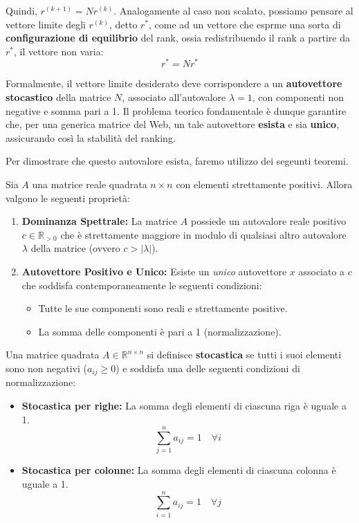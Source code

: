 Quindi, $r^{(k + 1)} = N r^{(k)}$. Analogamente al caso non scalato, possiamo pensare al vettore limite degli $r^{(k)}$, detto $r^*$, come ad un vettore che esprme una sorta di \textbf{configurazione di equilibrio} del rank, ossia redistribuendo il rank a partire da $r^*$, il vettore non varia: 
\[
r^* = N r^*
\]

Formalmente, il vettore limite desiderato deve corrispondere a un \textbf{autovettore stocastico} della matrice $N$, associato all'autovalore $\lambda=1$, con componenti non negative e somma pari a 1.
Il problema teorico fondamentale è dunque garantire che, per una generica matrice del Web, un tale autovettore \textbf{esista} e sia \textbf{unico}, assicurando così la stabilità del ranking.

Per dimostrare che questo autovalore esista, faremo utilizzo dei segeunti teoremi.

\begin{teorema}\label{teo:th_perron}
Sia $A$ una matrice reale quadrata $n \times n$ con elementi strettamente positivi. Allora valgono le seguenti proprietà:
\begin{enumerate}
    \item \textbf{Dominanza Spettrale:} La matrice $A$ possiede un autovalore reale positivo $c \in \mathbb{R}_{>0}$ che è strettamente maggiore in modulo di qualsiasi altro autovalore $\lambda$ della matrice (ovvero $c > |\lambda|$).
    \item \textbf{Autovettore Positivo e Unico:} Esiste un \textit{unico} autovettore $x$ associato a $c$ che soddisfa contemporaneamente le seguenti condizioni:
    \begin{itemize}
        \item Tutte le sue componenti sono reali e strettamente positive.
        \item La somma delle componenti è pari a 1 (normalizzazione).
    \end{itemize}
\end{enumerate}
\end{teorema}

\begin{definizione}
Una matrice quadrata $A \in \mathbb{R}^{n \times n}$ si definisce \textbf{stocastica} se tutti i suoi elementi sono non negativi ($a_{ij} \ge 0$) e soddisfa una delle seguenti condizioni di normalizzazione:

\begin{itemize}
    \item \textbf{Stocastica per righe:} La somma degli elementi di ciascuna riga è uguale a 1.
    \[ \sum_{j=1}^n a_{ij} = 1 \quad \forall i \]
    \item \textbf{Stocastica per colonne:} La somma degli elementi di ciascuna colonna è uguale a 1.
    \[ \sum_{i=1}^n a_{ij} = 1 \quad \forall j \]
\end{itemize}
\end{definizione}

